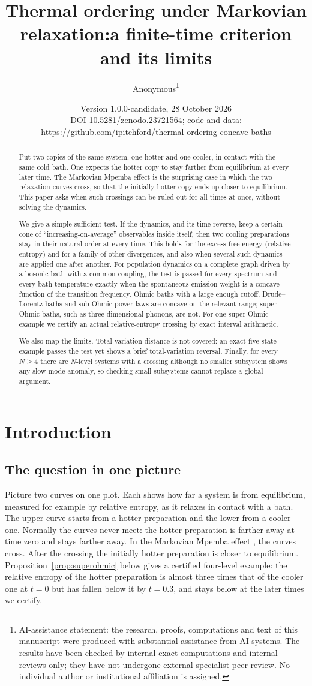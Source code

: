 \documentclass[11pt,a4paper]{article}
\title{Thermal ordering under Markovian relaxation:\newline a finite-time criterion and its limits}
\author{Anonymous\thanks{AI-assistance statement: the research, proofs, computations and text of this manuscript were produced with substantial assistance from AI systems. The results have been checked by internal exact computations and internal reviews only; they have not undergone external specialist peer review. No individual author or institutional affiliation is assigned.}}
\date{Version 1.0.0-candidate, 28 October 2026\\[2pt]\small DOI \href{https://doi.org/10.5281/zenodo.23721564}{10.5281/zenodo.23721564}; code and data: \url{https://github.com/ipitchford/thermal-ordering-concave-baths}}
\theoremstyle{remark}\newtheorem{remark}[theorem]{Remark}
\begin{document}
\maketitle
\begin{abstract}
Put two copies of the same system, one hotter and one cooler, in contact with the same cold bath. One expects the hotter copy to stay farther from equilibrium at every later time. The Markovian Mpemba effect is the surprising case in which the two relaxation curves cross, so that the initially hotter copy ends up closer to equilibrium. This paper asks when such crossings can be ruled out for all times at once, without solving the dynamics.

We give a simple sufficient test. If the dynamics, and its time reverse, keep a certain cone of ``increasing-on-average'' observables inside itself, then two cooling preparations stay in their natural order at every time. This holds for the excess free energy (relative entropy) and for a family of other divergences, and also when several such dynamics are applied one after another. For population dynamics on a complete graph driven by a bosonic bath with a common coupling, the test is passed for every spectrum and every bath temperature exactly when the spontaneous emission weight is a concave function of the transition frequency. Ohmic baths with a large enough cutoff, Drude--Lorentz baths and sub-Ohmic power laws are concave on the relevant range; super-Ohmic baths, such as three-dimensional phonons, are not. For one super-Ohmic example we certify an actual relative-entropy crossing by exact interval arithmetic.

We also map the limits. Total variation distance is not covered: an exact five-state example passes the test yet shows a brief total-variation reversal. Finally, for every $N\ge4$ there are $N$-level systems with a crossing although no smaller subsystem shows any slow-mode anomaly, so checking small subsystems cannot replace a global argument.
\end{abstract}

\section{Introduction}
\subsection{The question in one picture}
Picture two curves on one plot. Each shows how far a system is from equilibrium, measured for example by relative entropy, as it relaxes in contact with a bath. The upper curve starts from a hotter preparation and the lower from a cooler one. Normally the curves never meet: the hotter preparation is farther away at time zero and stays farther away. In the Markovian Mpemba effect \cite{LuRaz2017}, the curves cross. After the crossing the initially hotter preparation is closer to equilibrium. Proposition~\ref{prop:superohmic} below gives a certified four-level example: the relative entropy of the hotter preparation is almost three times that of the cooler one at $t=0$ but has fallen below it by $t=0.3$, and stays below at the later times we certify.
\end{document}
